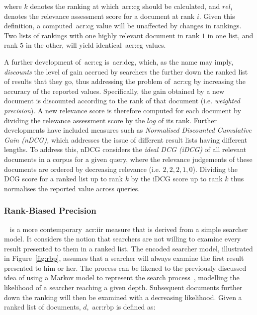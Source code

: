 where $k$ denotes the ranking at which~\gls{acr:cg} should be calculated, and $rel_i$ denotes the relevance assessment score for a document at rank $i$. Given this definition, a computed~\gls{acr:cg} value will be unaffected by changes in rankings. Two lists of rankings with one highly relevant document in rank $1$ in one list, and rank $5$ in the other, will yield identical~\gls{acr:cg} values.

A further development of~\gls{acr:cg} is~\gls{acr:dcg}, which, as the name may imply, \emph{discounts} the level of gain accrued by searchers the further down the ranked list of results that they go, thus addressing the problem of~\gls{acr:cg} by increasing the accuracy of the reported values. Specifically, the gain obtained by a new document is discounted according to the rank of that document (i.e. \emph{weighted precision}). A new relevance score is therefore computed for each document by dividing the relevance assessment score by the $log$ of its rank. Further developments have included measures such as \emph{Normalised Discounted Cumulative Gain (nDCG),} which addresses the issue of different result lists having different lengths. To address this, nDCG considers the \emph{ideal DCG (iDCG)} of all relevant documents in a corpus for a given query, where the relevance judgements of these documents are ordered by decreasing relevance (i.e. $2,2,2,1,0$). Dividing the DCG score for a ranked list up to rank $k$ by the iDCG score up to rank $k$ thus normalises the reported value across queries.

\subsubsection{Rank-Biased Precision}\label{sec:ir_background:evaluation:system:rbp}
~\citep{moffat2008rbp} is a more contemporary~\gls{acr:iir} measure that is derived from a simple searcher model. It considers the notion that searchers are not willing to examine every result presented to them in a ranked list. The encoded searcher model, illustrated in Figure~\ref{fig:rbp}, assumes that a searcher will always examine the first result presented to him or her. The process can be likened to the previously discussed idea of using a Markov model to represent the search process~\citep{tran2017markov_models}, modelling the likelihood of a searcher reaching a given depth. Subsequent documents further down the ranking will then be examined with a decreasing likelihood. Given a ranked list of documents, $d$,~\gls{acr:rbp} is defined as:

